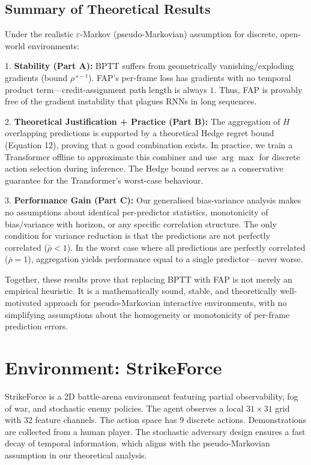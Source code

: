 \documentclass[11pt]{article}
\begin{document}
\subsection{Summary of Theoretical Results}

Under the realistic \(\varepsilon\)-Markov (pseudo-Markovian) assumption for discrete, open-world environments:

1. \textbf{Stability (Part A):} BPTT suffers from geometrically vanishing/exploding gradients (bound \(\rho^{\,s-t}\)). FAP's per-frame loss has gradients with no temporal product term—credit-assignment path length is always \(1\). Thus, FAP is provably free of the gradient instability that plagues RNNs in long sequences.

2. \textbf{Theoretical Justification + Practice (Part B):} The aggregation of \(H\) overlapping predictions is supported by a theoretical Hedge regret bound (Equation 12), proving that a good combination exists. In practice, we train a Transformer offline to approximate this combiner and use \(\arg\max\) for discrete action selection during inference. The Hedge bound serves as a conservative guarantee for the Transformer's worst-case behaviour.

3. \textbf{Performance Gain (Part C):} Our generalised bias-variance analysis makes no assumptions about identical per-predictor statistics, monotonicity of bias/variance with horizon, or any specific correlation structure. The only condition for variance reduction is that the predictions are not perfectly correlated (\(\bar{\rho} < 1\)). In the worst case where all predictions are perfectly correlated (\(\bar{\rho} = 1\)), aggregation yields performance equal to a single predictor—never worse.

Together, these results prove that replacing BPTT with FAP is not merely an empirical heuristic. It is a mathematically sound, stable, and theoretically well-motivated approach for pseudo-Markovian interactive environments, with no simplifying assumptions about the homogeneity or monotonicity of per-frame prediction errors.

\section{Environment: StrikeForce}
StrikeForce is a 2D battle-arena environment featuring partial observability, fog of war, and stochastic enemy policies. The agent observes a local \(31\times31\) grid with 32 feature channels. The action space has 9 discrete actions. Demonstrations are collected from a human player. The stochastic adversary design ensures a fast decay of temporal information, which aligns with the pseudo-Markovian assumption in our theoretical analysis.
\end{document}
